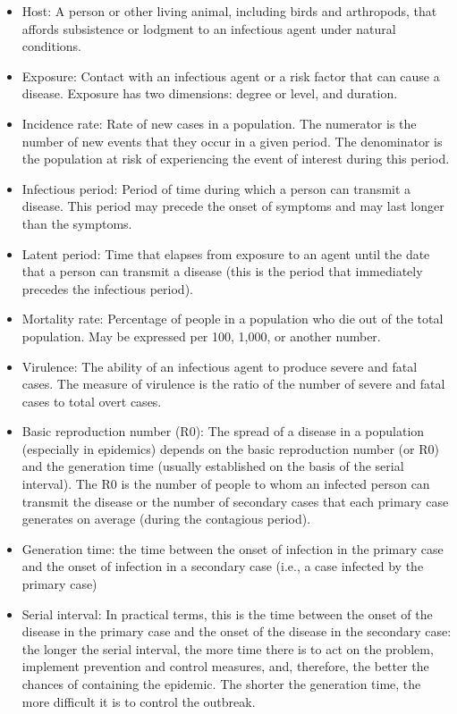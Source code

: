 \begin{itemize}
\item Host: A person or other living animal, including birds and arthropods, that affords
subsistence or lodgment to an infectious agent under natural conditions.
\item Exposure: Contact with an infectious agent or a risk factor that can cause a disease.
Exposure has two dimensions: degree or level, and duration.
\item Incidence rate: Rate of new cases in a population. The numerator is the number of
new events that they occur in a given period. The denominator is the population at risk of
experiencing the event of interest during this period.
\item Infectious period: Period of time during which a person can transmit a disease. This period may precede the onset of symptoms and may last longer than the symptoms.
\item Latent period: Time that elapses from exposure to an agent until the date that
a person can transmit a disease (this is the period that immediately precedes the
infectious period).
\item Mortality rate: Percentage of people in a population who die out of the total
population. May be expressed per 100, 1,000, or another number.
\item Virulence: The ability of an infectious agent to produce severe and fatal cases. The measure of virulence is the ratio of the number of severe and fatal cases to total overt cases.
\item Basic reproduction number (R0): The spread of a disease in a population (especially in epidemics) depends on the basic reproduction number (or R0) and the generation time (usually established on the basis of the serial interval). The R0 is the number of people to whom an
infected person can transmit the disease or the number of secondary cases that each
primary case generates on average (during the contagious period).
\item Generation time: the time between the  onset of infection in the primary case and the
onset of infection in a secondary case (i.e., a case infected by the primary case)
\item Serial interval: In practical terms, this is the time between the onset of the disease
in the primary case and the onset of the disease in the secondary case: the longer the serial interval, the more time there is to act on the problem, implement prevention and control measures, and, therefore, the better the chances of containing the epidemic.
The shorter the generation time, the more difficult it is to control the outbreak.

\end{itemize}
